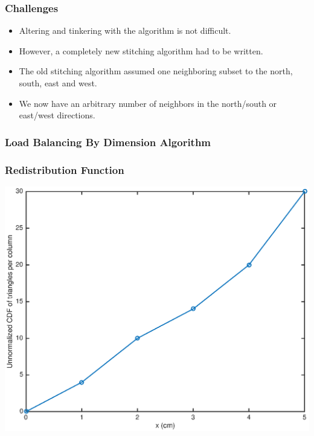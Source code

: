 \documentclass[compress]{beamer}
\begin{document}
\begin{frame}[t]\frametitle{Challenges}
\begin{block}{}
\begin{itemize}
\item Altering and tinkering with the algorithm is not difficult.
\item However, a completely new stitching algorithm had to be written.
\item The old stitching algorithm assumed one neighboring subset to the north, south, east and west.
\item We now have an arbitrary number of neighbors in the north/south or east/west directions.
\end{itemize}
\end{block}
\end{frame}

\begin{frame}[t]\frametitle{Load Balancing By Dimension Algorithm}
\vspace{-0.5 cm}
\begin{block}{}

\end{block}
\end{frame}

\begin{frame}[t]\frametitle{Redistribution Function}
\centering
\includegraphics[scale = 0.5]{figures/before_redistribute.eps}
\end{frame}
\end{document}
